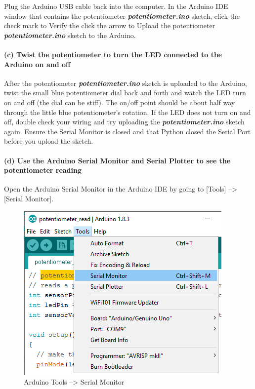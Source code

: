 \documentclass[11pt]{article}
\begin{document}
Plug the Arduino USB cable back into the computer. In the Arduino IDE
window that contains the potentiometer \textbf{\emph{potentiometer.ino}}
sketch, click the check mark to Verify the click the arrow to Upload the
potentiometer \textbf{\emph{potentiometer.ino}} sketch to the Arduino.

    \hypertarget{c-twist-the-potentiometer-to-turn-the-led-connected-to-the-arduino-on-and-off}{%
\paragraph{(c) Twist the potentiometer to turn the LED connected to the
Arduino on and
off}\label{c-twist-the-potentiometer-to-turn-the-led-connected-to-the-arduino-on-and-off}}

After the potentiometer \textbf{\emph{potentiometer.ino}} sketch is
uploaded to the Arduino, twist the small blue potentiometer dial back
and forth and watch the LED turn on and off (the dial can be stiff). The
on/off point should be about half way through the little blue
potentiometer's rotation. If the LED does not turn on and off, double
check your wiring and try uploading the
\textbf{\emph{potentiometer.ino}} sketch again. Ensure the Serial
Monitor is closed and that Python closed the Serial Port before you
upload the sketch.

    \hypertarget{d-use-the-arduino-serial-monitor-and-serial-plotter-to-see-the-potentiometer-reading}{%
\paragraph{(d) Use the Arduino Serial Monitor and Serial Plotter to see
the potentiometer
reading}\label{d-use-the-arduino-serial-monitor-and-serial-plotter-to-see-the-potentiometer-reading}}

Open the Arduino Serial Monitor in the Arduino IDE by going to
{[}Tools{]} --\textgreater{} {[}Serial Monitor{]}.

\begin{figure}
\centering
\includegraphics{images/Tools_SerialMonitor.png}
\caption{Arduino Tools --\textgreater{} Serial Monitor}
\end{figure}
\end{document}

